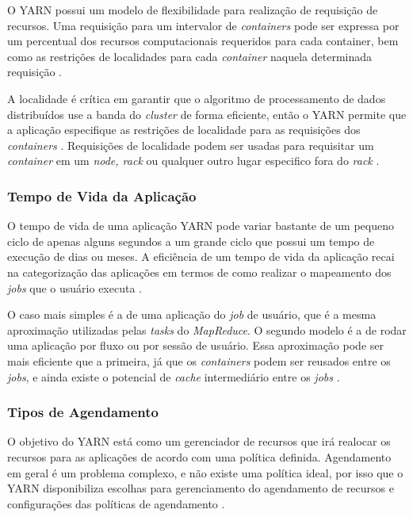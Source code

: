                 O YARN possui um modelo de flexibilidade para realização de requisição de recursos. Uma requisição para um
                intervalor de \textit{containers} pode ser expressa por um percentual dos recursos computacionais requeridos
                para cada container, bem como as restrições de localidades para cada \textit{container} naquela determinada
                requisição \cite{white2015}.

                A localidade é crítica em garantir que o algoritmo de processamento de dados distribuídos use a banda do
                \textit{cluster} de forma eficiente, então o YARN permite que a aplicação especifique as restrições de
                localidade para as requisições dos \textit{containers} \cite{vavilapalli2013}. Requisições de localidade
                podem ser usadas para requisitar um \textit{container} em um \textit{node, rack} ou qualquer outro lugar
                especifico fora do \textit{rack} \cite{white2015}.

            \subsubsection{Tempo de Vida da Aplicação}

                O tempo de vida de uma aplicação YARN pode variar bastante de um pequeno ciclo de apenas alguns segundos
                a um grande ciclo que possui um tempo de execução de dias ou meses. A eficiência de um tempo de vida da
                aplicação recai na categorização das aplicações em termos de como realizar o mapeamento dos \textit{jobs}
                que o usuário executa \cite{yarnapache}.

                O caso mais simples é a de uma aplicação do \textit{job} de usuário, que é a mesma aproximação utilizadas pelas
                \textit{tasks} do \textit{MapReduce}. O segundo modelo é a de rodar uma aplicação por fluxo ou por sessão de
                usuário. Essa aproximação pode ser mais eficiente que a primeira, já que os \textit{containers} podem ser reusados
                entre os \textit{jobs}, e ainda existe o potencial de \textit{cache} intermediário entre os \textit{jobs}
                \cite{yarnapache}.

            \subsubsection{Tipos de Agendamento}

                O objetivo do YARN está como um gerenciador de recursos que irá realocar os recursos para as aplicações de acordo
                com uma política definida. Agendamento em geral é um problema complexo, e não existe uma política ideal, por isso
                que o YARN disponibiliza escolhas para gerenciamento do agendamento de recursos e configurações das políticas de
                agendamento \cite{vavilapalli2013}.

